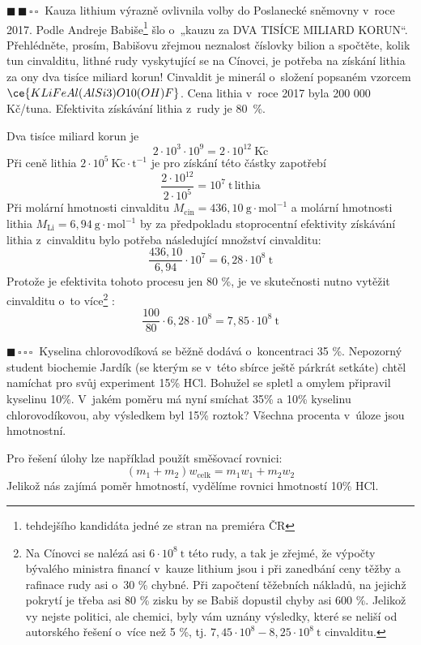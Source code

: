 \documentclass{book}
\newcommand{\jeden}{$\blacksquare \, \square \, \square \, \square \; \; $}
\newcommand{\dva}{$\blacksquare \, \blacksquare \, \square \, \square \; \; $}
\renewenvironment{quotation}{\par}{\par} %
\begin{document}
\hrulefill %
\begin{quotation}
\dva Kauza lithium výrazně ovlivnila volby do Poslanecké sněmovny v~roce
2017. Podle Andreje Babiše\footnote{tehdejšího kandidáta jedné ze stran na premiéra ČR} šlo o~„kauzu za DVA TISÍCE MILIARD KORUN“.
Přehlédněte, prosím, Babišovu zřejmou neznalost číslovky bilion a
spočtěte, kolik tun cinvalditu, lithné rudy vyskytující se na Cínovci,
je potřeba na získání lithia za ony dva tisíce miliard korun! Cinvaldit
je minerál o~složení popsaném vzorcem $\ce{KLiFeAl(AlSi3)O10(OH)F}$. Cena lithia v~roce 2017 byla 200 000
Kč/tuna. Efektivita získávání lithia z~rudy je 80~\%. 
\end{quotation} \dotfill \par
Dva tisíce miliard korun je 
\[
2\cdot10^{3}\cdot10^{9}=2\cdot10^{12}\ \mathrm{K\check{c}}
\]
Při ceně lithia $2\cdot10^{5}\ \mathrm{K\check{c}\cdot t^{-1}}$ je
pro získání této částky zapotřebí 
\[
\frac{2\cdot10^{12}}{2\cdot10^{5}}=10^{7}\ \mathrm{t\, lithia}
\]
Při molární hmotnosti cinvalditu $M_{\mathrm{ cin}}=436,10\ \mathrm{g\cdot mol^{-1}}$
a molární hmotnosti lithia $M_{\mathrm{Li}}=6,94\ \mathrm{g\cdot mol^{-1}}$
by za předpokladu stoprocentní efektivity získávání lithia z~cinvalditu
bylo potřeba následující množství cinvalditu:
\[
\frac{436,10}{6,94}\cdot10^{7}=6,28\cdot10^{8}\ \mathrm{t}
\]
Protože je efektivita tohoto procesu jen 80 \%, je ve
skutečnosti nutno vytěžit cinvalditu o~to více\footnote{Na Cínovci se nalézá asi $6\cdot10^{8}\ \mathrm{t}$ této rudy, a
tak je zřejmé, že výpočty bývalého ministra financí v~kauze lithium
jsou i při zanedbání ceny těžby a rafinace rudy asi o~30 \% chybné.
Při započtení těžebních nákladů, na jejichž pokrytí je třeba asi 80
\% zisku by se Babiš dopustil chyby asi 600 \%. Jelikož vy nejste
politici, ale chemici, byly vám uznány výsledky, které se neliší od
autorského řešení o~více než 5 \%, tj. $7,45\cdot10^{8} - 8,25\cdot10^{8}\ \mathrm{t}$
cinvalditu.}
:
\[
\frac{100}{80}\cdot6,28\cdot10^{8}=7,85\cdot10^{8}\ \mathrm{t}
\]

\hrulefill %
\begin{quotation}
\jeden Kyselina chlorovodíková se běžně dodává o~koncentraci 35 \%. Nepozorný
student biochemie Jardík (se kterým se v~této sbírce ještě párkrát setkáte) chtěl namíchat pro svůj experiment 15\% HCl. Bohužel
se spletl a omylem připravil kyselinu 10\%. V~jakém poměru má nyní
smíchat 35\% a 10\% kyselinu chlorovodíkovou, aby výsledkem byl 15\%
roztok? Všechna procenta v~úloze jsou hmotnostní. 
\end{quotation} \dotfill \par 
Pro řešení úlohy lze například použít směšovací rovnici: 
\[
\left(m_{1}+m_{2}\right)w_{\mathrm{celk}}=m_{1}w_{1}+m_{2}w_{2}
\]
 Jelikož nás zajímá poměr hmotností, vydělíme rovnici hmotností 10\%
HCl. 
\end{document}
